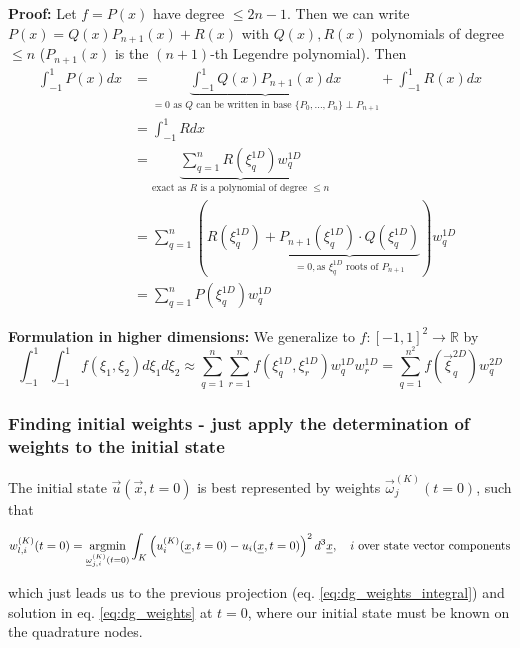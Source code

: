 \textbf{Proof: } Let $f = P(x)$ have degree $\leq 2n-1$. Then we can write
$P(x) = Q(x) P_{n+1}(x) + R(x)$ with $Q(x), R(x)$ polynomials of degree $\leq n$ ($P_{n+1}(x)$ is the $(n+1)$-th Legendre polynomial).
Then 
\begin{equation}
    \begin{aligned}
        \int_{-1}^{1} P(x) d x &=\underbrace{\int_{-1}^{1} Q(x) P_{n+1}(x) d x}_{=0\text{ as } Q \text{ can be written in base } \{P_0,\dots,P_n\} \perp P_{n+1}}+\int_{-1}^{1} R(x) d x \\
        &=\int_{-1}^{1} R d x \\
        &=\underbrace{\sum_{q=1}^{n} R\left(\xi_{q}^{1 D}\right) w_{q}^{1 D}}_{\text{exact as } R \text{ is a polynomial of degree } \leq n} \\
        &=\sum_{q=1}^{n} \left( R\left(\xi_{q}^{1 D}\right) + \underbrace{P_{n+1}(\xi_{q}^{1 D}) \cdot Q(\xi_{q}^{1 D})}_{=0, \text{as } \xi_{q}^{1 D} \text{ roots of } P_{n+1}} \right)w_{q}^{1 D} \\
        &= \sum_{q=1}^{n} P(\xi_{q}^{1 D}) w_{q}^{1 D}
    \end{aligned}
\end{equation}

\textbf{Formulation in higher dimensions: } We generalize to $f: [-1,1]^2 \rightarrow \mathbb{R}$ by
\begin{equation}
    \int_{-1}^1 \int_{-1}^1 f\left(\xi_1, \xi_2\right) d \xi_1 d \xi_2 \approx \sum_{q=1}^n \sum_{r=1}^n f\left(\xi_q^{1 D}, \xi_r^{1 D}\right) w_q^{1 D} w_r^{1 D}=\sum_{q=1}^{n^2} f\left(\vec{\xi}_q^{2 D}\right) w_q^{2 D}
\end{equation}

\subsubsection{Finding initial weights - just apply the determination of weights to the initial state}
The initial state $\vec{u}(\vec{x}, t=0)$ is best represented by weights $\vec{\omega}_j^{(K)}(t=0)$, such that

\begin{equation}
    w_{l,i}^{(K)}(t=0)= \argmin_{\vec{\omega}_{j,i}^{(K)}(t=0)} \int_{K} \left( u_i^{(K)}(\vec{x}, t=0) - u_i(\vec{x}, t=0) \right)^2 d^3 \vec{x}, \quad i \text{ over state vector components}
\end{equation}

which just leads us to the previous projection (eq. \ref{eq:dg_weights_integral}) and solution in eq. \ref{eq:dg_weights} at $t=0$, where
our initial state must be known on the quadrature nodes.

